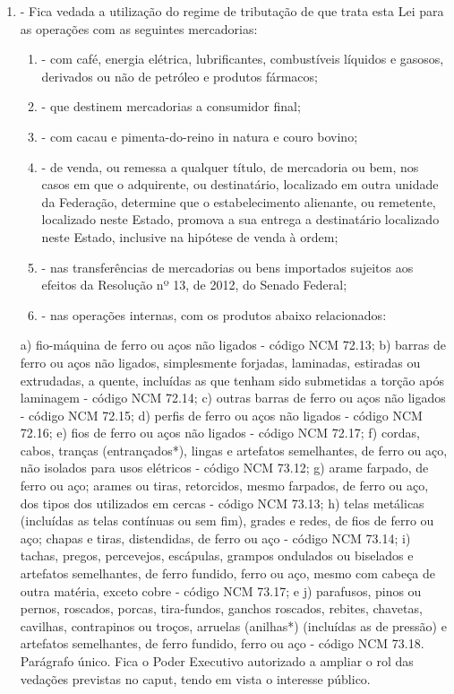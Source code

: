 \documentclass[10pt]{article}
\begin{document}
\begin{enumerate}[label=Art. \arabic*\textdegree]
\item - Fica vedada a utilização do regime de tributação de que trata esta Lei para as operações com as seguintes mercadorias:
\begin{enumerate}[label=\Roman*]
\item - com café, energia elétrica, lubrificantes, combustíveis líquidos e gasosos, derivados ou não de petróleo e produtos fármacos;
\item - que destinem mercadorias a consumidor final;
\item - com cacau e pimenta-do-reino in natura e couro bovino;
\item - de venda, ou remessa a qualquer título, de mercadoria ou bem, nos casos em que o adquirente, ou destinatário, localizado em outra unidade da Federação, determine que o estabelecimento alienante, ou remetente, localizado neste Estado, promova a sua entrega a destinatário localizado neste Estado, inclusive na hipótese de venda à ordem;
\item - nas transferências de mercadorias ou bens importados sujeitos aos efeitos da Resolução nº 13, de 2012, do Senado Federal;
\item - nas operações internas, com os produtos abaixo relacionados:
\end{enumerate}
a) fio-máquina de ferro ou aços não ligados - código NCM 72.13;
b) barras de ferro ou aços não ligados, simplesmente forjadas, laminadas, estiradas ou extrudadas, a quente, incluídas as que tenham sido submetidas a torção após laminagem - código NCM 72.14;
c) outras barras de ferro ou aços não ligados - código NCM 72.15;
d) perfis de ferro ou aços não ligados - código NCM 72.16;
e) fios de ferro ou aços não ligados - código NCM 72.17;
f) cordas, cabos, tranças (entrançados*), lingas e artefatos semelhantes, de ferro ou aço, não isolados para usos elétricos - código NCM 73.12;
g) arame farpado, de ferro ou aço; arames ou tiras, retorcidos, mesmo farpados, de ferro ou aço, dos tipos dos utilizados em cercas - código NCM 73.13;
h) telas metálicas (incluídas as telas contínuas ou sem fim), grades e redes, de fios de ferro ou aço; chapas e tiras, distendidas, de ferro ou aço - código NCM 73.14;
i) tachas, pregos, percevejos, escápulas, grampos ondulados ou biselados e artefatos semelhantes, de ferro fundido, ferro ou aço, mesmo com cabeça de outra matéria, exceto cobre - código NCM 73.17; e
j) parafusos, pinos ou pernos, roscados, porcas, tira-fundos, ganchos roscados, rebites, chavetas, cavilhas, contrapinos ou troços, arruelas (anilhas*) (incluídas as de pressão) e artefatos semelhantes, de ferro fundido, ferro ou aço - código NCM 73.18.
Parágrafo único. Fica o Poder Executivo autorizado a ampliar o rol das vedações previstas no caput, tendo em vista o interesse público.


\end{enumerate}
\end{document}
